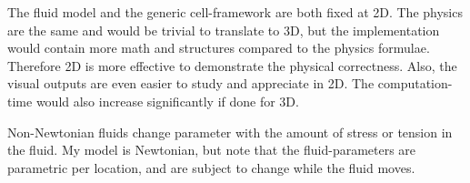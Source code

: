 \documentclass{article}
\begin{document}
The fluid model and the generic cell-framework are both
fixed at 2D.  The physics are the same and would be
trivial to translate to 3D, but the implementation
would contain more math and structures compared to the
physics formulae.  Therefore 2D is more effective
to demonstrate the physical correctness.  Also, the
visual outputs are even easier to study and
appreciate in 2D.  The computation-time would also
increase significantly if done for 3D.

Non-Newtonian fluids change parameter with the amount of
stress or tension in the fluid.
My model is Newtonian, but note that the fluid-parameters
are parametric per location, and are subject to change while
the fluid moves.

\begin{comment}


\end{comment}
\end{document}
